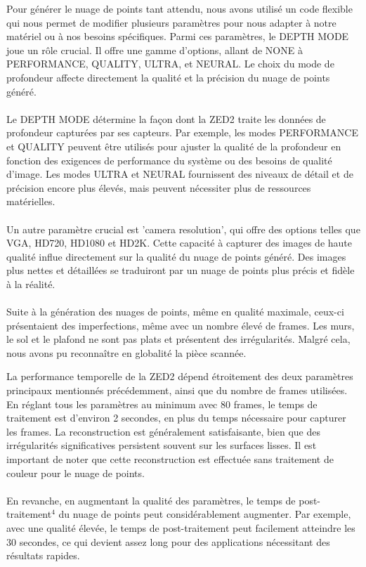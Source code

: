         \normalsize{
            Pour générer le nuage de points tant attendu, nous avons utilisé un code flexible qui nous permet de modifier plusieurs paramètres pour nous adapter à notre matériel ou à nos besoins spécifiques. Parmi ces paramètres, le DEPTH MODE joue un rôle crucial. Il offre une gamme d'options, allant de NONE à PERFORMANCE, QUALITY, ULTRA, et NEURAL. Le choix du mode de profondeur affecte directement la qualité et la précision du nuage de points généré.
        }
        \\ \\
        \normalsize{
            Le DEPTH MODE détermine la façon dont la ZED2 traite les données de profondeur capturées par ses capteurs. Par exemple, les modes PERFORMANCE et QUALITY peuvent être utilisés pour ajuster la qualité de la profondeur en fonction des exigences de performance du système ou des besoins de qualité d'image. Les modes ULTRA et NEURAL fournissent des niveaux de détail et de précision encore plus élevés, mais peuvent nécessiter plus de ressources matérielles.
        }
        \\ \\
        \normalsize{
            Un autre paramètre crucial est 'camera resolution', qui offre des options telles que VGA, HD720, HD1080 et HD2K. Cette capacité à capturer des images de haute qualité influe directement sur la qualité du nuage de points généré. Des images plus nettes et détaillées se traduiront par un nuage de points plus précis et fidèle à la réalité.
        }
        \\ \\
        \normalsize{
            Suite à la génération des nuages de points, même en qualité maximale, ceux-ci présentaient des imperfections, même avec un nombre élevé de frames. Les murs, le sol et le plafond ne sont pas plats et présentent des irrégularités. Malgré cela, nous avons pu reconnaître en globalité la pièce scannée.
        }
        
            \normalsize{
                La performance temporelle de la ZED2 dépend étroitement des deux paramètres principaux mentionnés précédemment, ainsi que du nombre de frames utilisées. En réglant tous les paramètres au minimum avec 80 frames, le temps de traitement est d'environ 2 secondes, en plus du temps nécessaire pour capturer les frames. La reconstruction est généralement satisfaisante, bien que des irrégularités significatives persistent souvent sur les surfaces lisses. Il est important de noter que cette reconstruction est effectuée sans traitement de couleur pour le nuage de points.
            }
            \\ \\
            \normalsize{
                En revanche, en augmentant la qualité des paramètres, le temps de post-traitement$^4$ du nuage de points peut considérablement augmenter. Par exemple, avec une qualité élevée, le temps de post-traitement peut facilement atteindre les 30 secondes, ce qui devient assez long pour des applications nécessitant des résultats rapides.
            }

